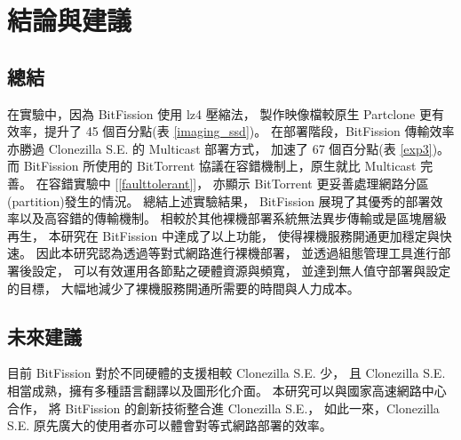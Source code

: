 \chapter{結論與建議}
\label{c:conclusion}
\section{總結}
在實驗中，因為 BitFission 使用 lz4 壓縮法，
製作映像檔較原生 Partclone 更有效率，提升了 45 個百分點(表 \ref{imaging_ssd})。
在部署階段，BitFission 傳輸效率亦勝過 Clonezilla S.E. 的 Multicast 部署方式，
加速了 67 個百分點(表 \ref{exp3})。
而 BitFission 所使用的 BitTorrent 協議在容錯機制上，原生就比 Multicast 完善。
在容錯實驗中 [\ref{faulttolerant}]，
亦顯示 BitTorrent 更妥善處理網路分區(partition)發生的情況。
總結上述實驗結果，
BitFission 展現了其優秀的部署效率以及高容錯的傳輸機制。
相較於其他裸機部署系統無法異步傳輸或是區塊層級再生，
本研究在 BitFission 中達成了以上功能，
使得裸機服務開通更加穩定與快速。
因此本研究認為透過等對式網路進行裸機部署，
並透過組態管理工具進行部署後設定，
可以有效運用各節點之硬體資源與頻寬，
並達到無人值守部署與設定的目標，
大幅地減少了裸機服務開通所需要的時間與人力成本。

\section{未來建議}
目前 BitFission 對於不同硬體的支援相較 Clonezilla S.E. 少，
且 Clonezilla S.E. 相當成熟，擁有多種語言翻譯以及圖形化介面。
本研究可以與國家高速網路中心合作，
將 BitFission 的創新技術整合進 Clonezilla S.E.，
如此一來，Clonezilla S.E. 原先廣大的使用者亦可以體會對等式網路部署的效率。
